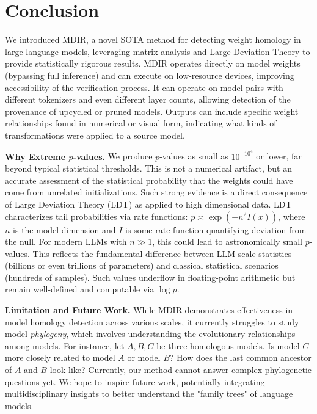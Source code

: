 \documentclass{article} %
\begin{document}
\section{Conclusion}

We introduced MDIR, a novel SOTA method for detecting weight homology in large language models, 
leveraging matrix analysis and Large Deviation Theory to provide statistically rigorous results.  
MDIR operates directly on model weights (bypassing full inference) and can execute on low-resource devices, improving accessibility of the verification process. It can operate on model pairs with different tokenizers and even different layer counts, allowing detection of the provenance of upcycled or pruned models. Outputs can include specific weight relationships found in numerical or visual form, indicating what kinds of transformations were applied to a source model.

\textbf{Why Extreme $p$-values. } We produce $p$-values as small as $10^{-10^4}$ or lower, far beyond typical statistical thresholds.
This is not a numerical artifact, but an accurate assessment of the statistical probability that the weights could have come from unrelated initializations. Such strong evidence is a direct consequence of Large Deviation Theory (LDT) as applied to high dimensional data.
LDT characterizes tail probabilities via rate functions: $p \asymp \exp(-n^2 I(x))$, 
where $n$ is the model dimension and $I$ is some rate function quantifying deviation from the null. 
For modern LLMs with $n \gg 1$, this could lead to astronomically small $p$-values.
This reflects the fundamental difference between LLM-scale statistics (billions or even trillions of parameters) and classical statistical scenarios (hundreds of samples).  
Such values underflow in floating-point arithmetic but remain well-defined and computable via $\log p$.

\textbf{Limitation and Future Work.}
While MDIR demonstrates effectiveness in model homology detection across various scales, it currently struggles to study model \textit{phylogeny}, which involves understanding the evolutionary relationships among models. For instance, let $A, B, C$ be three homologous models. Is model $C$ more closely related to model $A$ or model $B$? How does the last common ancestor of $A$ and $B$ look like? Currently, our method cannot answer complex phylogenetic questions yet. We hope to inspire future work, potentially integrating multidisciplinary insights to better understand the "family trees" of language models.
\end{document}
